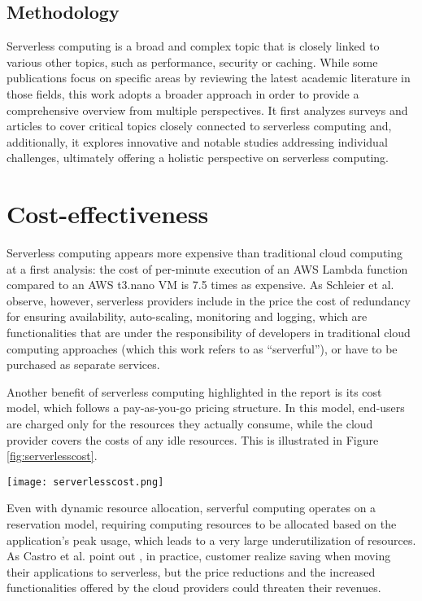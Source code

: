 \documentclass[
	a4paper, %
	12pt,
	twoside, %
]{LTJournalArticle}
\begin{document}
\subsection{Methodology}
Serverless computing is a broad and complex topic that is closely linked to various other topics, such as performance, security or caching. While some publications focus on specific areas by reviewing the latest academic literature in those fields, this work adopts a broader approach in order to provide a comprehensive overview from multiple perspectives. It first analyzes surveys and articles to cover critical topics closely connected to serverless computing and, additionally, it explores innovative and notable studies addressing individual challenges, ultimately offering a holistic perspective on serverless computing.

\section{Cost-effectiveness}
\label{sec:costeffectiveness}
Serverless computing appears more expensive than traditional cloud computing at a first analysis: the cost of per-minute execution of an AWS Lambda function compared to an AWS t3.nano VM is 7.5 times as expensive. As Schleier et al. \cite{schleier-smith_what_2021}observe, however, serverless providers include in the price the cost of redundancy for ensuring availability, auto-scaling, monitoring and logging, which are functionalities that are under the responsibility of developers in traditional cloud computing approaches (which this work refers to as ``serverful''), or have to be purchased as separate services.

Another benefit of serverless computing highlighted in the report is its cost model, which follows a pay-as-you-go pricing structure. In this model, end-users are charged only for the resources they actually consume, while the cloud provider covers the costs of any idle resources. This is illustrated in Figure \ref{fig:serverlesscost}.

\begin{figure*}
	\texttt{[image: serverlesscost.png]}
	\caption{Advantages of serverless computing's cost model. Source: \cite{schleier-smith_what_2021}}
	\label{fig:serverlesscost}
\end{figure*}

Even with dynamic resource allocation, serverful computing operates on a reservation model, requiring computing resources to be allocated based on the application's peak usage, which leads to a very large underutilization of resources. As Castro et al. point out \cite{schleier-smith_what_2021}, in practice, customer realize saving when moving their applications to serverless, but the price reductions and the increased functionalities offered by the cloud providers could threaten their revenues. 
\end{document}
